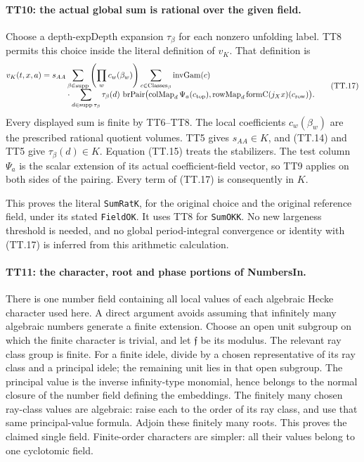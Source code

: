\paragraph{TT10: the actual global sum is rational over the given field.}
Choose a depth-$\mathrm{expDepth}$ expansion $\tau_\beta$ for
each nonzero unfolding label. TT8 permits this choice inside the
literal definition of $v_K$. That definition is
\[
\begin{split}
 v_K(t,x,a)={}&s_{AA}
 \sum_{\beta\in\operatorname{supp}}
       \left(\prod_w c_w(\beta_w)\right)
 \sum_{c\in\operatorname{Classes}_\beta}
       \operatorname{invGam}(c)\\[-2mm]
 &\hspace{6mm}\cdot\sum_{d\in\operatorname{supp}\tau_\beta}
       \tau_\beta(d)\,
       \operatorname{brPair}\bigl(
        \operatorname{colMap}_d\Psi_a(c_{\rm top}),
        \operatorname{rowMap}_d\operatorname{formC}(j_Xx)(c_{\rm row})
                              \bigr).
\end{split}\tag{TT.17}\]
Every displayed sum is finite by TT6--TT8. The local coefficients
$c_w(\beta_w)$ are the prescribed rational quotient volumes.
TT5 gives $s_{AA}\in K$, and (TT.14) and TT5 give
$\tau_\beta(d)\in K$. Equation (TT.15) treats the stabilizers.
The test column $\Psi_a$ is the scalar extension of its actual
coefficient-field vector, so TT9 applies on both sides of the
pairing. Every term of (TT.17) is consequently in $K$.

This proves the literal \texttt{SumRatK}, for the original choice
and the original reference field, under its stated
\texttt{FieldOK}. It uses TT8 for \texttt{SumOKK}. No new
largeness threshold is needed, and no global period-integral
convergence or identity with (TT.17) is inferred from this
arithmetic calculation.

\paragraph{TT11: the character, root and phase portions of NumbersIn.}
There is one number field containing all local values of each
algebraic Hecke character used here. A direct argument avoids
assuming that infinitely many algebraic numbers generate a finite
extension. Choose an open unit subgroup on which the finite
character is trivial, and let $\mathfrak f$ be its modulus.
The relevant ray class group is finite. For a finite idele, divide
by a chosen representative of its ray class and a principal idele;
the remaining unit lies in that open subgroup. The principal
value is the inverse infinity-type monomial, hence belongs to the
normal closure of the number field defining the embeddings. The
finitely many chosen ray-class values are algebraic: raise each
to the order of its ray class, and use that same principal-value
formula. Adjoin these finitely many roots. This proves the claimed
single field. Finite-order characters are simpler: all their
values belong to one cyclotomic field.

